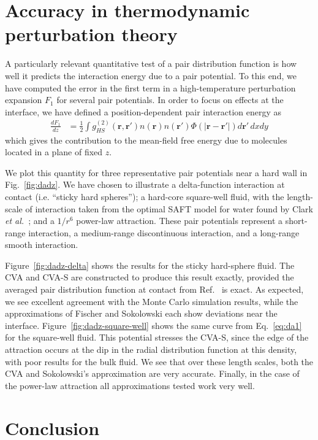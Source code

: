 \documentclass[letterpaper,twocolumn,amsmath,amssymb,pre,aps,10pt]{revtex4-1}
\newcommand{\rr}{\textbf{r}}
\begin{document}
\section{Accuracy in thermodynamic perturbation theory}

A particularly relevant quantitative test of a pair distribution
function is how well it predicts the interaction energy due to a pair
potential.  To this end, we have computed the error in the first term
in a high-temperature perturbation expansion $F_1$
for several pair potentials.  In order to focus on effects at the
interface, we have defined a position-dependent pair interaction
energy as
\begin{align}
  \frac{dF_1}{dz} &=
  \tfrac12 \int g^{(2)}_{HS}(\rr,\rr')n(\rr)n(\rr')\Phi(|\rr-\rr'|)
  d\rr'\, dxdy\label{eq:da1}
\end{align}
which gives the contribution to the mean-field free energy due to
molecules located in a plane of fixed $z$.

We plot this quantity for three representative
pair potentials near a hard wall in Fig.~\ref{fig:dadz}.  We have
chosen to illustrate a delta-function interaction at contact
(i.e. ``sticky hard spheres''); a hard-core square-well fluid, with
the length-scale of interaction taken from the optimal SAFT model for
water found by Clark \emph{et al.}~\cite{clark2006developing}; and a
$1/r^6$ power-law attraction.  These pair potentials represent a
short-range interaction, a medium-range discontinuous interaction, and
a long-range smooth interaction.

Figure~\ref{fig:dadz-delta} shows the results for the sticky
hard-sphere fluid.  The CVA and CVA-S are constructed to produce this
result exactly, provided the averaged pair distribution function at
contact from Ref.~ is exact.  As expected,
we see excellent agreement with the Monte Carlo simulation results,
while the approximations of Fischer and Sokolowski each show
deviations near the interface.  Figure~\ref{fig:dadz-square-well}
shows the same curve from Eq.~\ref{eq:da1} for the square-well fluid.
This potential stresses the CVA-S, since the edge of the attraction
occurs at the dip in the radial distribution function at this density,
with poor results for the bulk fluid.  We see that over these length
scales, both the CVA and Sokolowski's approximation are very accurate.
Finally, in the case of the power-law attraction all approximations
tested work very well.

\section{Conclusion}
\end{document}
